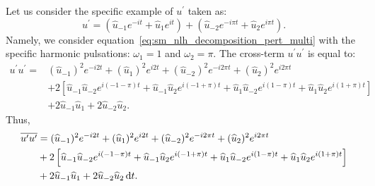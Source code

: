
\label{app:wrong_multi_nlh}

Let us consider the specific example of $u^\prime$ taken as:
\begin{equation}
	u^\prime = (\widehat{u}_{-1} e^{-i t} + \widehat{u}_{1} e^{i t}) +
		(\widehat{u}_{-2} e^{-i \pi t} + \widehat{u}_{2} e^{i \pi t}).
\end{equation}
Namely, we consider equation~\eqref{eq:sm_nlh_decomposition_pert_multi}
with the specific harmonic 
pulsations: $\omega_1 = 1$ and $\omega_2 = \pi$.
The cross-term $u^\prime u^\prime$ is equal to:
\begin{equation}
	\begin{split}
		u^\prime u^\prime = 
			&(\widehat{u}_{-1})^2 e^{-i 2 t}
			+ (\widehat{u}_{1})^2 e^{i 2 t}
			+ (\widehat{u}_{-2})^2 e^{- i 2 \pi t}
			+ (\widehat{u}_{2})^2 e^{i 2 \pi t} \\
		&+ 2 \left[
				\widehat{u}_{-1} \widehat{u}_{-2} e^{i (-1 -\pi) t} 
				+ \widehat{u}_{-1} \widehat{u}_{2} e^{i (-1 + \pi) t}
				+ \widehat{u}_{1} \widehat{u}_{-2} e^{i (1 - \pi) t} 
				+ \widehat{u}_{1} \widehat{u}_{2} e^{i (1 + \pi) t} 
			 \right] \\
		&+ 2 \widehat{u}_{-1}\widehat{u}_{1}
			 	+ 2 \widehat{u}_{-2}\widehat{u}_{2}.
	\end{split}
\end{equation}
Thus,
\begin{equation}
	\begin{split}
		\overline{u^\prime u^\prime} &=
			  (\widehat{u}_{-1})^2 e^{-i 2 t}
			+ (\widehat{u}_{1})^2 e^{i 2 t}
			+ (\widehat{u}_{-2})^2 e^{- i 2 \pi t}
			+ (\widehat{u}_{2})^2 e^{i 2 \pi t} \\
		&+ 2 \left[
				\widehat{u}_{-1} \widehat{u}_{-2} e^{i (-1 -\pi) t} 
				+ \widehat{u}_{-1} \widehat{u}_{2} e^{i (-1 + \pi) t}
				+ \widehat{u}_{1} \widehat{u}_{-2} e^{i (1 - \pi) t} 
				+ \widehat{u}_{1} \widehat{u}_{2} e^{i (1 + \pi) t} 
			 \right] \\
		&+ 2 \widehat{u}_{-1}\widehat{u}_{1}
			 	+ 2 \widehat{u}_{-2}\widehat{u}_{2} \mathop{}\!\mathrm{d} t.
	\end{split}
\end{equation}